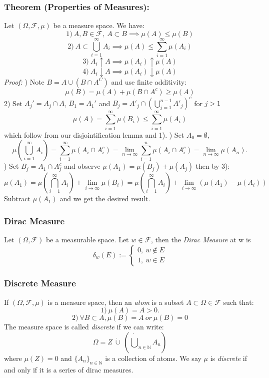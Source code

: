 \documentclass{article}
\begin{document}
\subsubsection{Theorem (Properties of Measures):}
Let  $(\Omega, \mathcal{F}, \mu)$ be a measure space. We have: 
\[
1) \ A,B\in\mathcal{F}, \ A\subset B \implies \mu(A)\leq\mu(B)
\]
\[
2) \ A\subset \bigcup_{i=1}^{\infty}A_i \implies \mu(A)\leq\sum_{i=1}^{\infty}\mu(A_i)
\]
\[
3) \ A_i \uparrow A \implies \mu(A_i)\uparrow \mu(A)
\]
\[
4) \ A_i \downarrow A \implies \mu(A_i) \downarrow\mu(A)
\]
\textit{Proof:} \newline {}) Note $B = A \cup (B\cap A^C)$ and use finite additivity: 
\[
\mu(B) = \mu(A)+\mu(B \cap A^c) \geq\mu(A)
\]
2) Set $A_j' = A_j \cap A$, $B_1=A_1'$ and $B_j=A'_j\cap(\bigcup_{j=1}^{n-1}A'_j)^c$ for $j>1$
\[
\mu(A) =  \sum_{i=1}^{\infty}\mu(B_i) \leq  \sum_{i=1}^{\infty}\mu(A_i)
\]
which follow from our disjointification lemma and 1). \newline {}) Set $A_0 = \emptyset$, 
\[
\mu(\bigcup_{i=1}^{\infty}A_i) = \sum_{i=1}^{\infty} \mu(A_i \cap A_i^c) =\lim_{n\to \infty}\sum_{i=1}^{n}\mu(A_i \cap A_i^c) = \lim_{n\to \infty}\mu(A_n).
\]\newline {}) Set $B_j= A_1\cap A_j^c$ and observe $\mu(A_1) = \mu(B_j)+\mu(A_j)$ then by 3):
\[
\mu(A_1) = \mu(\bigcap_{i=1}^{\infty}A_i) +\lim_{i\to \infty}\mu(B_i)= \mu(\bigcap_{i=1}^{\infty}A_i)+\lim_{i\to \infty}(\mu(A_1)-\mu(A_i))
\]
Subtract $\mu(A_1)$ and we get the desired result.

\subsubsection{Dirac Measure}
Let $(\Omega, \mathcal{F})$ be a measurable space. Let $w\in \mathcal{F}$, then the \emph{Dirac Measure} at w is 
\[
\delta_w(E):=\begin{cases}
0, \ w\notin E\\
1, \ w \in E
\end{cases}
\]

\subsubsection{Discrete Measure}
If $(\Omega, \mathcal{F}, \mu)$ is a measure space, then an \emph{atom}  is a subset $A \subset\Omega\in \mathcal{F}$ such that: 
\[
1) \ \mu(A) = A > 0.
\]
\[
2) \ \forall B \subset A, \mu(B)=A \ or \ \mu(B)=0
\]
The measure space is called \emph{discrete} if we can write: 
\[
\Omega = Z \ \dot{\cup} \ (\dot{\bigcup}_{n\in \mathbb{N}}A_n)
\]
where $\mu(Z) = 0$ and $\{A_n\}_{n \in \mathbb{N}}$ is a collection of atoms. \newline \newline
We say $\mu$ is \emph{discrete} if and only if it is a series of dirac measures.
\end{document}
